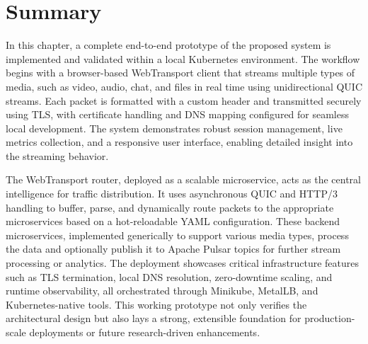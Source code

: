 \section{Summary}

In this chapter, a complete end-to-end prototype of the proposed system is implemented and validated within a local Kubernetes environment. The workflow begins with a browser-based WebTransport client that streams multiple types of media, such as video, audio, chat, and files in real time using unidirectional QUIC streams. Each packet is formatted with a custom header and transmitted securely using TLS, with certificate handling and DNS mapping configured for seamless local development. The system demonstrates robust session management, live metrics collection, and a responsive user interface, enabling detailed insight into the streaming behavior.

The WebTransport router, deployed as a scalable microservice, acts as the central intelligence for traffic distribution. It uses asynchronous QUIC and HTTP/3 handling to buffer, parse, and dynamically route packets to the appropriate microservices based on a hot-reloadable YAML configuration. These backend microservices, implemented generically to support various media types, process the data and optionally publish it to Apache Pulsar topics for further stream processing or analytics. The deployment showcases critical infrastructure features such as TLS termination, local DNS resolution, zero-downtime scaling, and runtime observability, all orchestrated through Minikube, MetalLB, and Kubernetes-native tools. This working prototype not only verifies the architectural design but also lays a strong, extensible foundation for production-scale deployments or future research-driven enhancements.
